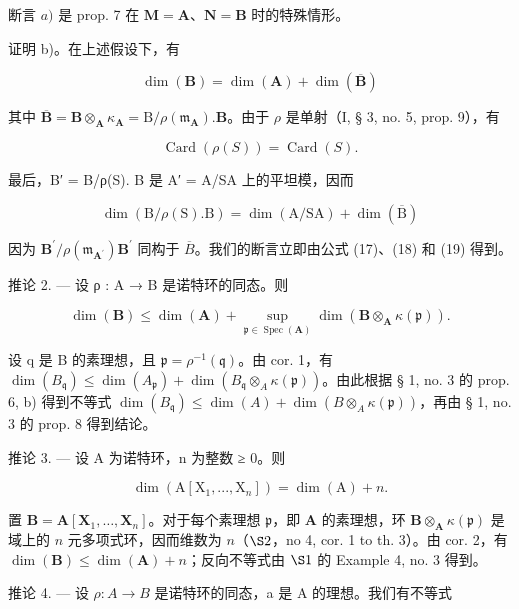 断言 \(a)\) 是 prop. 7 在 \(\mathbf{M} = \mathbf{A}\)、\(\mathbf{N} = \mathbf{B}\) 时的特殊情形。

证明 b)。在上述假设下，有

\[
\dim (\mathbf {B}) = \dim (\mathbf {A}) + \dim (\overline {{\mathbf {B}}})\tag{17}
\]

其中 \(\overline{\mathbf{B}} = \mathbf{B} \otimes_{\mathbf{A}} \kappa_{\mathbf{A}} = \mathrm{B} / \rho(\mathfrak{m}_{\mathbf{A}}) . \mathbf{B}\)。由于 \(\rho\) 是单射（I, § 3, no. 5, prop. 9），有

\[
\operatorname{Card} (\rho (S)) = \operatorname{Card} (S).\tag{18}
\]

最后，B′ = B/ρ(S). B 是 A′ = A/SA 上的平坦模，因而

\[
\dim (\mathrm{B} / \rho (\mathrm{S}). \mathrm{B}) = \dim (\mathrm{A} / \mathrm{SA}) + \dim (\overline {{\mathrm{B}}})\tag{19}
\]

因为 \(\mathbf{B}^{\prime}/\rho(\mathfrak{m}_{\mathbf{A}^{\prime}})\mathbf{B}^{\prime}\) 同构于 \(\overline{B}\)。我们的断言立即由公式 (17)、(18) 和 (19) 得到。

推论 2. — 设 ρ : A → B 是诺特环的同态。则

\[
\dim (\mathbf {B}) \leqslant \dim (\mathbf {A}) + \sup _ {\mathfrak {p} \in \operatorname{Spec} (\mathbf {A})} \dim (\mathbf {B} \otimes_ {\mathbf {A}} \kappa (\mathfrak {p})).
\]

设 q 是 B 的素理想，且 \(\mathfrak{p} = \rho^{-1}(\mathfrak{q})\)。由 cor. 1，有 \(\dim(B_{\mathfrak{q}}) \leqslant \dim(A_{\mathfrak{p}}) + \dim(B_{\mathfrak{q}} \otimes_{A} \kappa(\mathfrak{p}))\)。由此根据 § 1, no. 3 的 prop. 6, b) 得到不等式 \(\dim(B_{\mathfrak{q}}) \leqslant \dim(A) + \dim(B \otimes_{A} \kappa(\mathfrak{p}))\)，再由 § 1, no. 3 的 prop. 8 得到结论。

推论 3. --- 设 A 为诺特环，n 为整数 ≥ 0。则

\[
\dim (\mathrm{A} [ \mathrm{X} _ {1},..., \mathrm{X} _ {n} ]) = \dim (\mathrm{A}) + n.
\]

置 \(\mathbf{B} = \mathbf{A}[\mathbf{X}_1, \ldots, \mathbf{X}_n]\)。对于每个素理想 \(\mathfrak{p}\)，即 \(\mathbf{A}\) 的素理想，环 \(\mathbf{B} \otimes_{\mathbf{A}} \kappa(\mathfrak{p})\) 是域上的 \(n\) 元多项式环，因而维数为 \(n\)（\(\S 2\)，no 4, cor. 1 to th. 3）。由 cor. 2，有 \(\dim(\mathbf{B}) \leqslant \dim(\mathbf{A}) + n\)；反向不等式由 \(\S 1\) 的 Example 4, no. 3 得到。

推论 4. --- 设 \(\rho: A \to B\) 是诺特环的同态，a 是 A 的理想。我们有不等式

